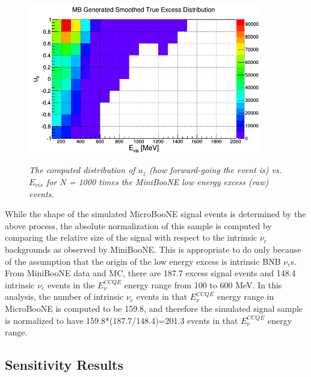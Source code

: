 \begin{figure}[ht!]
\centering
	\includegraphics[width=0.9\textwidth]{Figures/miniboone_excess_th2d.png} \\
\caption{\textit{The computed distribution of $u_z$ (how forward-going the event is) vs. $E_{vis}$ for N = 1000 times the MiniBooNE low energy excess (raw) events.}}\label{MBth2dfig}
\end{figure}

While the shape of the simulated MicroBooNE signal events is determined by the above process, the absolute normalization of this sample is computed by comparing the relative size of the signal with respect to the intrinsic $\nu_e$ backgrounds as observed by MiniBooNE. This is appropriate to do only because of the assumption that the origin of the low energy excess is intrinsic BNB $\nu_e$s. From MiniBooNE data and MC, there are 187.7 excess signal events and 148.4 intrinsic $\nu_e$ events in the $E_\nu^{CCQE}$ energy range from 100 to 600 MeV. In this analysis, the number of intrinsic $\nu_e$ events in that $E_\nu^{CCQE}$ energy range in MicroBooNE is computed to be 159.8, and therefore the simulated signal sample is normalized to have 159.8*(187.7/148.4)=201.3 events in that $E_\nu^{CCQE}$ energy range.\\





















\subsection{Sensitivity Results}


